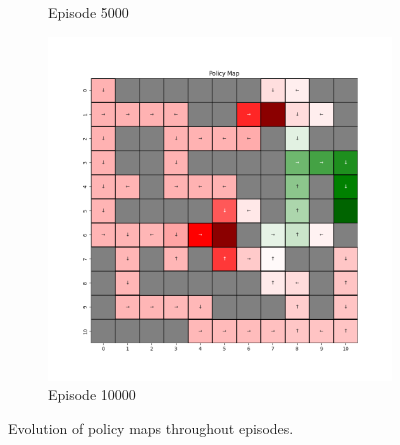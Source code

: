 \documentclass{assignment}
\begin{document}
\begin{figure}[H]
\begin{subfigure}{0.3\textwidth}
    \caption{Episode 5000}
    \end{subfigure}\hfill
    \begin{subfigure}{0.3\textwidth}
        \includegraphics[width=\textwidth]{figures/policy_td/alpha_sweep/policy_alpha_0.001_gamma_0.95_epsilon_0.2_iteration_10000.png}
    \caption{Episode 10000}
    \end{subfigure}
    \caption{Evolution of policy maps throughout episodes.}
    \label{fig:alpha_0.001_td_learning_policy}
\end{figure}
\end{document}
